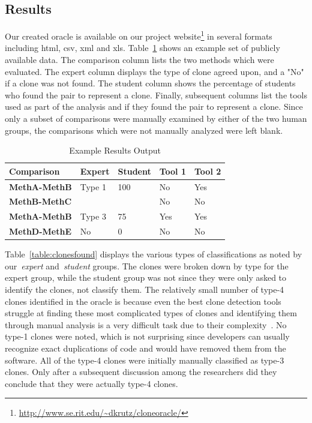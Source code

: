 \documentclass{sig-alternate}
\begin{document}
\subsection{Results}
Our created oracle is available on our project website\footnote{\url{http://www.se.rit.edu/~dkrutz/cloneoracle/}} in several formats including html, csv, xml and xls. Table~\ref{table:exampleoutput} shows an example set of publicly available data. The comparison column lists the two methods which were evaluated. The expert column displays the type of clone agreed upon, and a "No" if a clone was not found. The student column shows the percentage of students who found the pair to represent a clone. Finally, subsequent columns list the tools used as part of the analysis and if they found the pair to represent a clone. Since only a subset of comparisons were manually examined by either of the two human groups, the comparisons which were not manually analyzed were left blank.

\begin{table}[thb!]
\begin{center}
\caption{Example Results Output}
\label{table:exampleoutput}
    \begin{tabular}{ l | l | l | l | l  }
   \bfseries Comparison &\bfseries Expert & \bfseries Student & \bfseries Tool 1 & \bfseries Tool 2 \\ \hline \hline
   \bfseries MethA-MethB  & Type 1 & 100 & No   & Yes  \\ \hline
\bfseries MethB-MethC &  &  & No   & No  \\ \hline
\bfseries MethA-MethB & Type 3 &  75  & Yes   & Yes   \\ \hline
\bfseries MethD-MethE & No &  0  & No   & No   \\

    \end{tabular}
\end{center}

\end{table}


Table~\ref{table:clonesfound} displays the various types of classifications as noted by our~\emph{expert} and~\emph{student} groups. The clones were broken down by type for the expert group, while the student group was not since they were only asked to identify the clones, not classify them. The relatively small number of type-4 clones identified in the oracle is because even the best clone detection tools struggle at finding these most complicated types of clones and identifying them through manual analysis is a very difficult task due to their complexity~\cite{Roy:2009:CEC:1530898.1531101}. No type-1 clones were noted, which is not surprising since developers can usually recognize exact duplications of code and would have removed them from the software. All of the type-4 clones were initially manually classified as type-3 clones. Only after a subsequent discussion among the researchers did they conclude that they were actually type-4 clones.
\end{document}
